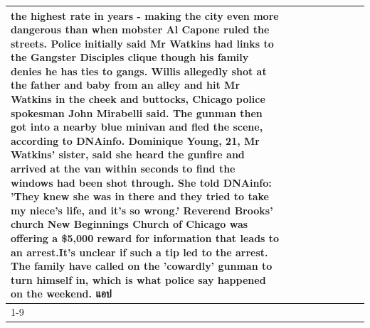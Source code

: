 \begin{table}[H]
\begin{tabular}{lllrlllll}
the highest rate in years - making the city even more dangerous than when mobster Al Capone ruled the streets. Police initially said Mr Watkins had links to the Gangster Disciples clique though his family denies he has ties to gangs. Willis allegedly shot at the father and baby from an alley and hit Mr Watkins in the cheek and buttocks, Chicago police spokesman John Mirabelli said. The gunman then got into a nearby blue minivan and fled the scene, according to DNAinfo. Dominique Young, 21, Mr Watkins' sister, said she heard the gunfire and arrived at the van within seconds to find the windows had been shot through. She told DNAinfo: 'They knew she was in there and they tried to take my niece's life, and it's so wrong.' Reverend Brooks' church New Beginnings Church of Chicago was offering a \$5,000 reward for information that leads to an arrest.It's unclear if such a tip led to the arrest. The family have called on the 'cowardly' gunman to turn himself in, which is what police say happened on the weekend. แอป \\
\cline{1-9}

\end{tabular}
\end{table}
